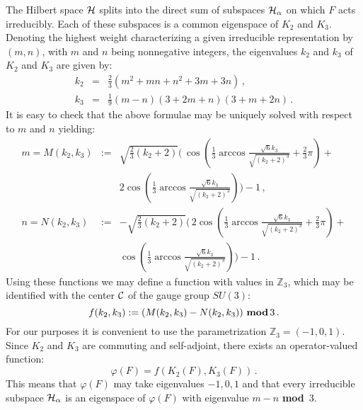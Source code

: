\documentclass[a4paper,12pt]{article}
\begin{document}
The Hilbert space $\cal H$ splits into the direct sum of subspaces
${\cal H}_\alpha$ on which $F$ acts irreducibly. Each of these
subspaces is a common eigenspace of $K_2$ and $K_3$. Denoting the
highest weight characterizing a given irreducible representation
by $(m,n)$, with $m$ and $n$ being nonnegative integers, the
eigenvalues $k_2$ and $k_3$ of $K_2$ and $K_3$ are given by:
\begin{eqnarray}
k_2  & = &  \frac 23 (m^2 + mn + n^2 + 3m + 3 n) \, ,\label{k2}\\
k_3  & = &  \frac 19 (m - n)(3 + 2m + n)(3 + m + 2n) \, .
\label{k3}
\end{eqnarray}
It is easy to check that the above formulae may be uniquely solved
with respect to $m$ and $n$ yielding:
\begin{eqnarray}
m =M(k_2,k_3) & := &  \sqrt{ {\textstyle \frac 23} (k_2 + 2)}
\Bigg( \, \cos \left( \frac 13 \arccos{\frac{\sqrt{6} k_3}
{\sqrt{(k_2 + 2)^3}}} + \frac 23 \pi \right) + \nonumber\\ & & 2
\cos \left( \frac 13 \arccos{\frac{\sqrt{6} k_3}{\sqrt{(k_2 +
2)^3}}} \right) \Bigg) - 1 \, , \\ n =N(k_2,k_3) & := &  - \sqrt{
{\textstyle \frac 23} (k_2 + 2)} \Bigg( \, 2 \cos \left( \frac 13
\arccos{\frac{\sqrt{6} k_3}{\sqrt{(k_2 + 2)^3}}} + \frac 23 \pi
\right) + \nonumber\\ & & \cos \left( \frac 13
\arccos{\frac{\sqrt{6} k_3}{\sqrt{(k_2 + 2)^3}}} \right) \Bigg) -
1 \, .
\end{eqnarray}
Using these functions we may define a function with values in
${\mathbb Z}_3$, which may be identified with the center ${\cal
C}$ of the gauge group $SU(3)$:
\begin{equation}\label{modulo}
f(k_2,k_3) := (M(k_2,k_3) - N(k_2,k_3)) \, \, \mbox{\rm \bf mod}
\, 3 \, .
\end{equation}
For our purposes it is convenient to use the parametrization
${\mathbb Z}_3 = (-1 , 0 , 1)$. Since $K_2$ and $K_3$ are
commuting and self-adjoint, there exists an operator-valued
function:
\begin{equation}
\varphi(F) =  f(K_2(F),K_3(F)) \, .
\end{equation}
This means that $\varphi(F)$ may take eigenvalues $-1,0,1$ and
that every irreducible subspace ${\cal H}_\alpha$ is an eigenspace
of $\varphi(F)$ with eigenvalue $m - n$ {\bf mod} $\, 3$.
\end{document}

